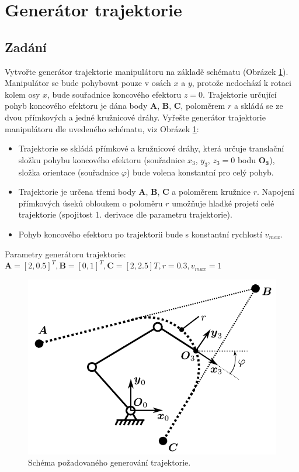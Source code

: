 \documentclass{article}
\begin{document}
	\section{Generátor trajektorie}
		\subsection{Zadání}
			Vytvořte generátor trajektorie manipulátoru na základě schématu (Obrázek \ref{pic:4_manipulator_trajektorie}). Manipulátor se bude pohybovat pouze v osách \(x\) a \(y\), protože nedochází k rotaci kolem osy \(x\), bude souřadnice koncového efektoru \(z=0\). Trajektorie určující pohyb koncového efektoru je dána body \textbf{A}, \textbf{B}, \textbf{C}, poloměrem \(r\) a skládá se ze dvou přímkových a jedné kružnicové dráhy.
			Vyřešte generátor trajektorie manipulátoru dle uvedeného schématu, viz Obrázek \ref{pic:4_manipulator_trajektorie}:
				\begin{itemize}
					\item Trajektorie se skládá přímkové a kružnicové dráhy, která určuje translační složku pohybu koncového efektoru (souřadnice \(x_3\), \(y_3\), \(z_3=0\) bodu \(\mathbf{O_3}\)), složka orientace (souřadnice \(\varphi\)) bude volena konstantní pro celý pohyb.\\
					\item Trajektorie je určena třemi body \(\mathbf{A}\), \(\mathbf{B}\), \(\mathbf{C}\) a poloměrem kružnice \(r\). Napojení přímkových úseků
					obloukem o poloměru \(r\) umožňuje hladké projetí celé trajektorie (spojitost 1. derivace dle
					parametru trajektorie).\\
					\item Pohyb koncového efektoru po trajektorii bude s konstantní rychlostí \(v_{max}\).
				\end{itemize}
			Parametry generátoru trajektorie:
			\(\mathbf{A} = [2, 0.5]^T, \mathbf{B} = [0, 1]^T, \mathbf{C} = [2, 2.5]T, r = 0.3, v_{max} = 1\)
				\begin{figure}[H]
					\centering
					\includegraphics[width=.5\textwidth]{./Graphics/4_Graphics/manipulator_trajektorie.pdf}
					\caption{Schéma požadovaného generování trajektorie.}
					\label{pic:4_manipulator_trajektorie}
				\end{figure}
\end{document}
